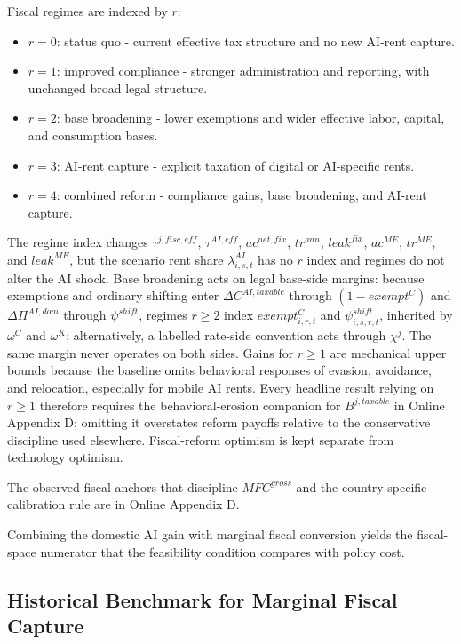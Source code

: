 \documentclass[11pt,a4paper]{article}
\begin{document}
Fiscal regimes are indexed by $r$:
\begin{itemize}
    \item $r=0$: status quo - current effective tax structure and no new AI-rent capture.
    \item $r=1$: improved compliance - stronger administration and reporting, with unchanged broad legal structure.
    \item $r=2$: base broadening - lower exemptions and wider effective labor, capital, and consumption bases.
    \item $r=3$: AI-rent capture - explicit taxation of digital or AI-specific rents.
    \item $r=4$: combined reform - compliance gains, base broadening, and AI-rent capture.
\end{itemize}
The regime index changes $\tau^{j,fisc,eff}$, $\tau^{AI,eff}$, $ac^{net,fix}$, $tr^{ann}$, $leak^{fix}$, $ac^{ME}$, $tr^{ME}$, and $leak^{ME}$, but the scenario rent share $\lambda^{AI}_{i,s,t}$ has no $r$ index and regimes do not alter the AI shock. Base broadening acts on legal base-side margins: because exemptions and ordinary shifting enter $\Delta C^{AI,taxable}$ through $(1-exempt^C)$ and $\Delta\Pi^{AI,dom}$ through $\psi^{shift}$, regimes $r\geq2$ index $exempt^C_{i,r,t}$ and $\psi^{shift}_{i,s,r,t}$, inherited by $\omega^C$ and $\omega^K$; alternatively, a labelled rate-side convention acts through $\chi^j$. The same margin never operates on both sides. Gains for $r\geq1$ are mechanical upper bounds because the baseline omits behavioral responses of evasion, avoidance, and relocation, especially for mobile AI rents. Every headline result relying on $r\geq1$ therefore requires the behavioral-erosion companion for $B^{j,taxable}$ in Online Appendix D; omitting it overstates reform payoffs relative to the conservative discipline used elsewhere. Fiscal-reform optimism is kept separate from technology optimism.

The observed fiscal anchors that discipline $MFC^{gross}$ and the country-specific calibration rule are in Online Appendix D.

Combining the domestic AI gain with marginal fiscal conversion yields the fiscal-space numerator that the feasibility condition compares with policy cost.

\subsection{Historical Benchmark for Marginal Fiscal Capture}\label{sec:historical_plausibility}
\end{document}
